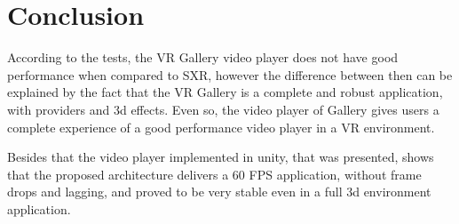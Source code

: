 \documentclass[runningheads]{llncs}
\begin{document}
\section{Conclusion} \label{conclusion}
According to the tests, the VR Gallery video player does not have good performance when compared to SXR, however the difference between then can be explained by the fact that the VR Gallery is a complete and robust application, with providers and 3d effects. Even so, the video player of Gallery gives users a complete experience of a good performance video player in a VR environment.

Besides that the video player implemented in unity, that was presented, shows that the proposed architecture delivers a 60 FPS application, without frame drops and lagging, and proved to be very stable even in a full 3d environment application.
%
%
%


\end{document}

